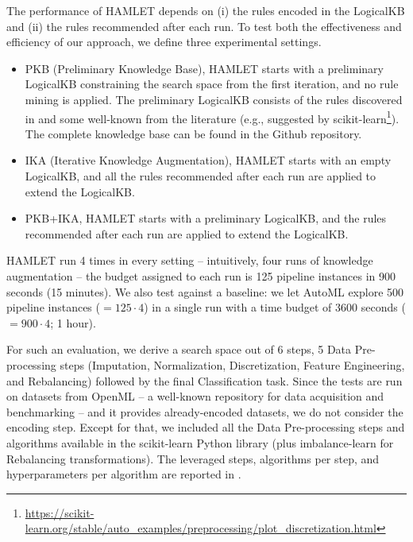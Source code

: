 \documentclass[5p,times]{elsarticle}
\newcommand{\mf}[1]{#1}
\begin{document}
The performance of HAMLET depends on (i) the rules encoded in the LogicalKB and (ii) the rules recommended after each run.
To test both the effectiveness and efficiency of our approach, we define three experimental settings.
\begin{itemize}
    \item PKB (Preliminary Knowledge Base), HAMLET starts with a preliminary LogicalKB constraining the search space from the first iteration, and no rule mining is applied.
    The preliminary LogicalKB consists of the rules discovered in \cite{giovanelli2021data} and some well-known from the literature (e.g., suggested by scikit-learn\footnote{\url{https://scikit-learn.org/stable/auto_examples/preprocessing/plot_discretization.html}}).
    The complete knowledge base can be found in the Github repository. 
    \item IKA (Iterative Knowledge Augmentation), HAMLET starts with an empty LogicalKB, and \mf{all the rules} recommended after each run are applied to extend the LogicalKB.
    \item PKB+IKA, HAMLET starts with a preliminary LogicalKB, and the rules recommended after each run are applied to extend the LogicalKB.
\end{itemize}
HAMLET run 4 times in every setting -- intuitively, four runs of knowledge augmentation -- the budget assigned to each run is \mf{125} pipeline instances in \mf{900} seconds (\mf{15} minutes).
We also test against a baseline: we let AutoML explore \mf{500} pipeline instances ($= \mf{125} \cdot 4$) in a single run with a time budget of \mf{3600} seconds ($= \mf{900} \cdot 4$; \mf{1 hour}).

For such an evaluation, we derive a search space out of 6 steps, 5 Data Pre-processing steps (Imputation, Normalization, Discretization, Feature Engineering, and Rebalancing) followed by the final Classification task.
Since the tests are run on datasets from OpenML \cite{OpenML2013} -- a well-known repository for data acquisition and benchmarking -- and it provides already-encoded datasets, we do not consider the encoding step. 
Except for that, we included all the Data Pre-processing steps and algorithms available in the scikit-learn \cite{scikit-learn} Python library (plus imbalance-learn \cite{JMLR:v18:16-365} for Rebalancing transformations).
The leveraged steps, algorithms per step, and hyperparameters per algorithm are reported in .
\end{document}
